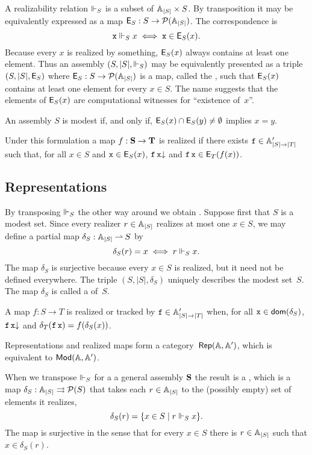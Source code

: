 A realizability relation $\Vdash_S$ is a subset of $\mathbb{A}_{|S|} \times S$. By transposition it may be equivalently expressed
as a map $\mathsf{E}_S : S \to \mathcal{P}(\mathbb{A}_{|S|})$. The correspondence is
%
\begin{equation*}
  \mathtt{x} \Vdash_S x \iff \mathtt{x} \in \mathsf{E}_S(x).
\end{equation*}
%
Because every $x$ is realized by something, $\mathsf{E}_S(x)$ always contains at least one element. Thus an assembly $(S, |S|, {\Vdash_{S}})$ may be equivalently presented as a triple $(S, |S|, \mathsf{E}_S)$ where $\mathsf{E}_S : S \to \mathcal{P}(\mathbb{A}_{|S|})$ is a map, called the , such that $\mathsf{E}_S(x)$ contains at least one element for every $x \in S$. The name suggests that the elements of $\mathsf{E}_S(x)$ are computational witnesses for ``existence of~$x$''.

An assembly $S$ is modest if, and only if, $\mathsf{E}_S(x) \cap \mathsf{E}_S(y) \neq \emptyset$ implies $x = y$.

Under this formulation a map $f : \mathbf{S} \to \mathbf{T}$ is realized if there exists $\mathtt{f} \in \mathbb{A}'_{|S| \to |T|}$ such that, for all $x \in S$ and $\mathtt{x} \in \mathsf{E}_S(x)$, $\mathtt{f}\,\mathtt{x}{\downarrow}$ and $\mathtt{f}\,\mathtt{x} \in \mathsf{E}_T(f(x))$.

\subsection{Representations}
\label{sec:representations}

By transposing $\Vdash_S$ the other way around we obtain . Suppose first that $S$ is a modest set. Since every realizer $r \in \mathbb{A}_{|S|}$ realizes at most one $x \in S$, we may define a partial map $\delta_S : \mathbb{A}_{|S|} \mathbin{\rightharpoonup} S$ by
%
\begin{equation*}
  \delta_S(r) = x \iff r \Vdash_S x.
\end{equation*}
%
The map $\delta_S$ is surjective because every $x \in S$ is realized, but it need not be defined everywhere. The triple $(S, |S|, \delta_S)$ uniquely describes the modest set~$S$. The map $\delta_S$ is called a  of~$S$.

A map $f : S \to T$ is realized or tracked by $\mathtt{f} \in \mathbb{A}'_{|S| \to |T|}$ when, for all $\mathtt{x} \in \mathsf{dom}(\delta_S)$, $\mathtt{f}\,\mathtt{x}{\downarrow}$ and $\delta_T(\mathtt{f}\,\mathtt{x}) = f(\delta_S(x))$.

Representations and realized maps form a category~$\mathsf{Rep}(\mathbb{A},\mathbb{A}')$, which is equivalent to $\mathsf{Mod}(\mathbb{A}, \mathbb{A}')$.

When we transpose $\Vdash_S$ for a a general assembly $\mathbf{S}$ the result is a , which is a map $\delta_S : \mathbb{A}_{|S|} \rightrightarrows \mathcal{P}(S)$ that takes each $r \in \mathbb{A}_{|S|}$ to the (possibly empty) set of elements it realizes,
%
\begin{equation*}
  \delta_S(r) = \{ x \in S \mid r \Vdash_S x\}.
\end{equation*}
%
The map is surjective in the sense that for every $x \in S$ there is $r \in \mathbb{A}_{|S|}$ such that $x \in \delta_S(r)$.

